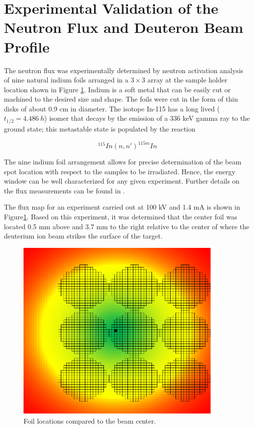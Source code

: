 \documentclass[review]{elsarticle}
\begin{document}
	
\section{Experimental Validation of the Neutron Flux and Deuteron Beam Profile}	

The neutron flux was experimentally determined by neutron activation analysis of nine natural indium foils arranged in a $3\times3$ array at the sample holder location shown in Figure \ref{fig:flux_map}. Indium is a soft metal that can be easily cut or machined to the desired size and shape. The foils were cut in the form of thin disks of about 0.9 cm in diameter. The isotope In-115 has a long lived ($t_{1/2}=4.486\ h$) isomer that decays by the emission of a 336 keV gamma ray to the ground state; this metastable state is populated by the reaction

\begin{equation} \nonumber
^{115}In(n,n')^{115m}In
\label{eqn:In115m}
\end{equation}

The nine indium foil arrangement allows for precise determination of the beam spot location with respect to the samples to be irradiated. Hence, the energy window can be well characterized for any given experiment. Further details on the flux measurements can be found in \cite{np_paper}.

The flux map for an experiment carried out at 100 kV and 1.4 mA is shown in Figure\ref{fig:flux_map}. Based on this experiment, it was determined that the center foil was located 0.5 mm above and 3.7 mm to the right relative to the center of where the deuterium ion beam strikes the surface of the target.  

\begin{figure}
	\centering
		\includegraphics[width=0.9\textwidth]{pics/flux_map}
	\caption{Foil locations compared to the beam center.}
	\label{fig:flux_map}
\end{figure}   
\end{document}
